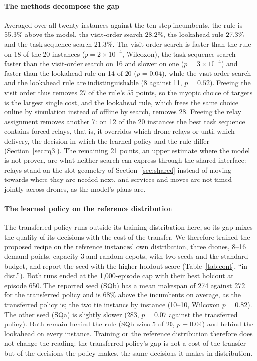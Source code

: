 \documentclass[final,5p,times,twocolumn]{elsarticle}
\begin{document}
\paragraph{The methods decompose the gap}
Averaged over all twenty instances against the ten-step incumbents, the rule is 55.3\% above the
model, the visit-order search 28.2\%, the lookahead rule 27.3\% and the task-sequence search
21.3\%. The visit-order search is faster than the rule on 18 of the 20 instances ($p = 2 \times
10^{-4}$, Wilcoxon), the task-sequence search faster than the visit-order search on 16 and slower
on one ($p = 3 \times 10^{-4}$) and faster than the lookahead rule on 14 of 20 ($p = 0.04$), while
the visit-order search and the lookahead rule are indistinguishable (8 against 11, $p = 0.52$).
Freeing the visit order thus removes 27 of the rule's 55 points, so the myopic choice of targets is
the largest single cost, and the lookahead rule, which frees the same choice online by simulation
instead of offline by search, removes 28. Freeing the relay assignment removes another 7: on 12 of
the 20 instances the best task sequence contains forced relays, that is, it overrides which drone
relays or until which delivery, the decision in which the learned policy and the rule differ
(Section~\ref{sec:rq3}). The remaining 21 points, an upper estimate where the model is not proven,
are what neither search can express through the shared interface: relays stand on the slot geometry
of Section~\ref{sec:shared} instead of moving towards where they are needed next, and services and
moves are not timed jointly across drones, as the model's plans are.

\paragraph{The learned policy on the reference distribution}
The transferred policy runs outside its training distribution here, so its gap mixes the quality of
its decisions with the cost of the transfer. We therefore trained the proposed recipe on the
reference instances' own distribution, three drones, 8--16 demand points, capacity 3 and random
depots, with two seeds and the standard budget, and report the seed with the higher holdout score
(Table~\ref{tab:cont}, ``in-dist.''). Both runs ended at the 1,000-episode cap with their best
holdout at episode 650. The reported seed (SQb) has a mean makespan of 274 against 272 for the
transferred policy and is 68\% above the incumbents on average, as the transferred policy is; the
two tie instance by instance (10--10, Wilcoxon $p=0.82$). The other seed (SQa) is slightly slower
(283, $p=0.07$ against the transferred policy). Both remain behind the rule (SQb wins 5 of 20,
$p=0.04$) and behind the lookahead on every instance. Training on the reference distribution
therefore does not change the reading: the transferred policy's gap is not a cost of the transfer
but of the decisions the policy makes, the same decisions it makes in distribution.
\end{document}
